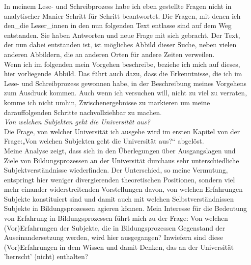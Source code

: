 \noindent In meinem Lese- und Schreibprozess habe ich eben gestellte Fragen nicht in
analytischer Manier Schritt für Schritt beantwortet. Die Fragen, mit denen ich
den\_die Leser\_innen in den nun folgenden Text entlasse sind auf dem Weg
entstanden. Sie haben Antworten und neue Frage mit sich gebracht. Der Text, der
nun dabei entstanden ist, ist mögliches Abbild dieser Suche, neben vielen
anderen Abbildern, die an anderen Orten für andere Zeiten verweilen.\\
Wenn ich im folgenden mein Vorgehen beschreibe, beziehe ich mich auf dieses,
hier vorliegende  Abbild. Das führt auch dazu, dass die Erkenntnisse, die ich
im Lese- und Schreibprozess gewonnen habe, in der Beschreibung meines Vorgehens
zum Ausdruck kommen. Auch wenn ich versuchen will, nicht zu viel zu verraten,
komme ich nicht umhin, Zwischenergebnisse zu markieren um meine darauffolgenden
Schritte nachvollziehbar zu machen.\\

\noindent\textit{Von welchen Subjekten geht die Universität aus?}\\
Die Frage, von
welcher Universität ich ausgehe wird im ersten Kapitel von der Frage:„Von
welchen Subjekten geht die Universität aus?“ abgelöst.\\
 Meine Analyse zeigt,
dass sich in den Überlegungen über Ausgangslagen und Ziele von
Bildungsprozessen an der Universität durchaus sehr unterschiedliche
Subjektverständnisse wiederfinden. Der Unterschied, so meine Vermutung,
entspringt hier weniger divergierenden theoretischen Positionen, sondern viel
mehr einander widerstreitenden Vorstellungen davon, von welchen Erfahrungen
Subjekte konstituiert sind und damit auch mit welchen Selbstverständnissen
Subjekte in Bildungsprozessen agieren können. Mein Interesse für die Bedeutung
von Erfahrung in Bildungsprozessen führt mich zu der Frage: Von welchen
(Vor)Erfahrungen der Subjekte, die in Bildungsprozessen Gegenstand der
Auseinandersetzung werden, wird hier ausgegangen? Inwiefern sind diese
(Vor)Erfahrungen in dem Wissen und damit Denken, das an der Universität
'herrscht' (nicht) enthalten?\\

